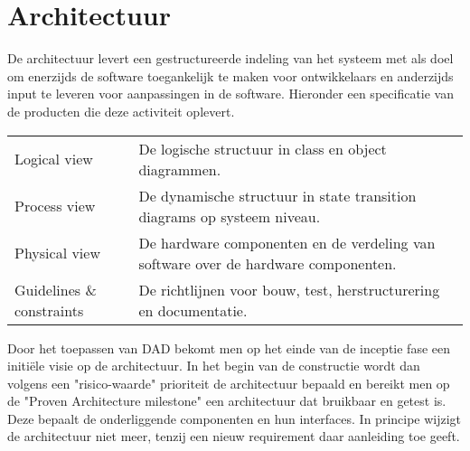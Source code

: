 
\section{Architectuur}

De architectuur levert een gestructureerde indeling van het systeem met als doel om enerzijds de software
toegankelijk te maken voor ontwikkelaars en anderzijds input te leveren voor aanpassingen in de software. Hieronder
een specificatie van de producten die deze activiteit oplevert.

{\tiny
\begin{center}
\begin{tabular}{lp{30em}}
Logical view & De logische structuur in class en object diagrammen.\\
Process view & De dynamische structuur in state
transition diagrams op systeem niveau.\\
Physical view &  De hardware componenten en de verdeling van
software over de hardware componenten.\\
Guidelines \& constraints & De richtlijnen voor bouw,
test, herstructurering en documentatie.\\
\end{tabular}
\end{center}
}

Door het toepassen van DAD bekomt men op het einde van de inceptie fase een
initi\"ele visie op de architectuur. In het begin van de constructie wordt dan
volgens een "risico-waarde" prioriteit de architectuur bepaald en bereikt men
op de "Proven Architecture milestone" een architectuur dat bruikbaar en getest
is. Deze bepaalt de onderliggende componenten en hun interfaces.
In principe wijzigt de architectuur niet meer, tenzij een nieuw requirement
daar aanleiding toe geeft.